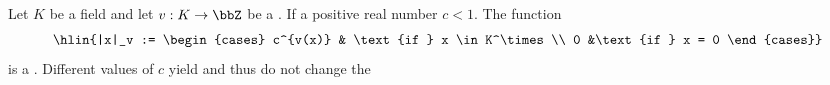 \begin{definition} \label{definition:nonarchimedean_absolute_value_induced_by_a_discrete_valuation_on_a_field}
    Let $K$ be a field and let $v: K \to \bbZ$ be a . If a positive real number $c < 1$. The function
    $$\hlin{|x|_v := \begin{cases} c^{v(x)} & \text{if } x \in K^\times \\ 0 &\text{if } x = 0 \end{cases}}$$
    is a . Different values of $c$ yield  and thus do not change the 
\end{definition}
